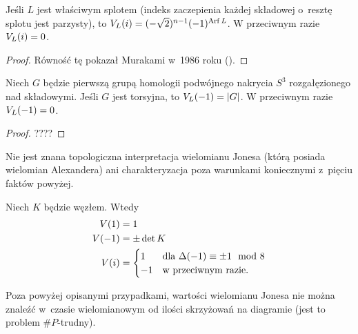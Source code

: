 \begin{proposition}
    Jeśli $L$ jest właściwym splotem (indeks zaczepienia każdej składowej o~resztę splotu jest parzysty), to $V_L(i) = (-\sqrt 2)^{n-1}(-1)^{\operatorname{Arf} L}$.
    W przeciwnym razie $V_L(i) = 0$.
\end{proposition}

\begin{proof}
%
    Równość tę pokazał Murakami w~1986 roku (\cite{murakami86}).
\end{proof}

\begin{proposition}
    Niech $G$ będzie pierwszą grupą homologii podwójnego nakrycia $S^3$ rozgałęzionego nad składowymi.
    Jeśli $G$ jest torsyjna, to $V_L(-1) = |G|$.
    W przeciwnym razie $V_L(-1) = 0$.
\end{proposition}

\begin{proof}
    ???? %
\end{proof}

Nie jest znana topologiczna interpretacja wielomianu Jonesa (którą posiada wielomian Alexandera) ani charakteryzacja poza warunkami koniecznymi z~pięciu faktów powyżej.

\begin{corollary}
    Niech $K$ będzie węzłem.
    Wtedy
    \begin{align}
        V(1) & = 1 \\
        V(-1) & = \pm \det K \\
        V(i) & = \begin{cases}
            1 & \text{dla } \Delta(-1) \equiv \pm 1 \mod 8 \\
            -1 & \text{w przeciwnym razie.}
        \end{cases}
    \end{align}
\end{corollary}

Poza powyżej opisanymi przypadkami, wartości wielomianu Jonesa nie można znaleźć w~czasie wielomianowym od ilości skrzyżowań na diagramie (jest to problem $\#P$-trudny).






